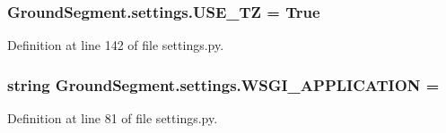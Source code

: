 \hypertarget{namespace_ground_segment_1_1settings_a1d9e63721f37542ce41c8145755c7d7e}{}
\subsubsection[{U\+S\+E\+\_\+\+T\+Z}]{\setlength{\rightskip}{0pt plus 5cm}Ground\+Segment.\+settings.\+U\+S\+E\+\_\+\+T\+Z = True}\label{namespace_ground_segment_1_1settings_a1d9e63721f37542ce41c8145755c7d7e}


Definition at line 142 of file settings.\+py.

\hypertarget{namespace_ground_segment_1_1settings_a5ae8b98baa409aa4ea87856e4114a64e}{}
\subsubsection[{W\+S\+G\+I\+\_\+\+A\+P\+P\+L\+I\+C\+A\+T\+I\+O\+N}]{\setlength{\rightskip}{0pt plus 5cm}string Ground\+Segment.\+settings.\+W\+S\+G\+I\+\_\+\+A\+P\+P\+L\+I\+C\+A\+T\+I\+O\+N = \textquotesingle{}}\label{namespace_ground_segment_1_1settings_a5ae8b98baa409aa4ea87856e4114a64e}


Definition at line 81 of file settings.\+py.

